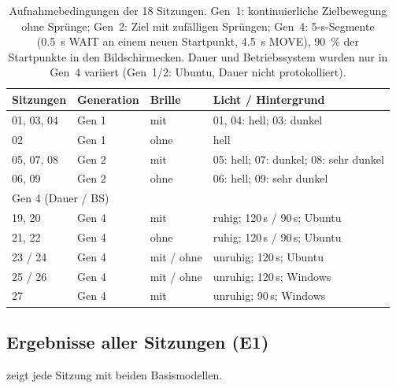 \documentclass[
  11pt,
  a4paper,
  oneside,
  DIV=12,
  BCOR=8mm,
  parskip=half,
  headings=normal,
  bibliography=totoc,
  listof=totoc
]{scrreprt}
\begin{document}
\begin{table}[htbp]
  \centering
  \caption{Aufnahmebedingungen der 18 Sitzungen. Gen~1: kontinuierliche
           Zielbewegung ohne Sprünge; Gen~2: Ziel mit zufälligen Sprüngen;
           Gen~4: 5-s-Segmente (\SI{0,5}{\second} WAIT an einem neuen
           Startpunkt, \SI{4,5}{\second} MOVE), \SI{90}{\percent} der
           Startpunkte in den Bildschirmecken. Dauer und Betriebssystem wurden
           nur in Gen~4 variiert (Gen~1/2: Ubuntu, Dauer nicht protokolliert).}
  \label{tab:session_conditions}
  \small
  \begin{tabular}{llll}
    \toprule
    Sitzungen & Generation & Brille & Licht / Hintergrund \\
    \midrule
    01, 03, 04 & Gen 1 & mit    & 01, 04: hell; 03: dunkel \\
    02         & Gen 1 & ohne   & hell \\
    05, 07, 08 & Gen 2 & mit    & 05: hell; 07: dunkel; 08: sehr dunkel \\
    06, 09     & Gen 2 & ohne   & 06: hell; 09: sehr dunkel \\
    \midrule
    \multicolumn{4}{l}{Gen 4 \quad (Dauer / BS)} \\
    19, 20 & Gen 4 & mit    & ruhig; 120\,s / 90\,s; Ubuntu \\
    21, 22 & Gen 4 & ohne   & ruhig; 120\,s / 90\,s; Ubuntu \\
    23 / 24 & Gen 4 & mit / ohne & unruhig; 120\,s; Ubuntu \\
    25 / 26 & Gen 4 & mit / ohne & unruhig; 120\,s; Windows \\
    27     & Gen 4 & mit    & unruhig; 90\,s; Windows \\
    \bottomrule
  \end{tabular}
\end{table}

\subsection{Ergebnisse aller Sitzungen (E1)}
\label{sec:sessions_results}

 zeigt jede Sitzung mit beiden Basismodellen.
\end{document}
